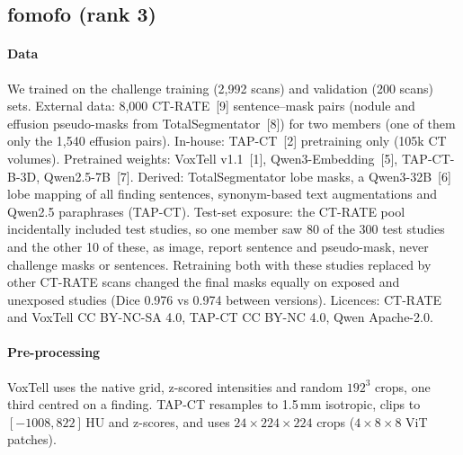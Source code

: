 
\subsection{fomofo (rank 3)}
\label{app:fomofo}

\paragraph{Data} We trained on the challenge training (2,992 scans) and validation (200 scans) sets. External data: 8,000 CT-RATE~[9] sentence--mask pairs (nodule and effusion pseudo-masks from TotalSegmentator~[8]) for two members (one of them only the 1,540 effusion pairs). In-house: TAP-CT~[2] pretraining only (105k CT volumes). Pretrained weights: VoxTell v1.1~[1], Qwen3-Embedding~[5], TAP-CT-B-3D, Qwen2.5-7B~[7]. Derived: TotalSegmentator lobe masks, a Qwen3-32B~[6] lobe mapping of all finding sentences, synonym-based text augmentations and Qwen2.5 paraphrases (TAP-CT). Test-set exposure: the CT-RATE pool incidentally included test studies, so one member saw 80 of the 300 test studies and the other 10 of these, as image, report sentence and pseudo-mask, never challenge masks or sentences. Retraining both with these studies replaced by other CT-RATE scans changed the final masks equally on exposed and unexposed studies (Dice 0.976 vs 0.974 between versions). Licences: CT-RATE and VoxTell CC BY-NC-SA 4.0, TAP-CT CC BY-NC 4.0, Qwen Apache-2.0.

\paragraph{Pre-processing} VoxTell uses the native grid, z-scored intensities and random $192^3$ crops, one third centred on a finding. TAP-CT resamples to 1.5\,mm isotropic, clips to $[-1008, 822]$\,HU and z-scores, and uses $24\times224\times224$ crops ($4\times8\times8$ ViT patches).

